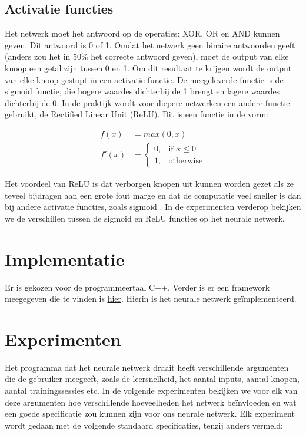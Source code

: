 \documentclass[10pt]{article}
\begin{document}
\subsection{Activatie functies}
Het netwerk moet het antwoord op de operaties: XOR, OR en AND kunnen geven. Dit antwoord is 0 of 1. Omdat het netwerk geen binaire antwoorden geeft (anders zou het in 50\% het correcte antwoord geven), moet de output van elke knoop een getal zijn tussen 0 en 1. Om dit resultaat te krijgen wordt de output van elke knoop gestopt in een activatie functie. De meegeleverde functie is de sigmoid functie, die hogere waardes dichterbij de 1 brengt en lagere waardes dichterbij de 0. In de praktijk wordt voor diepere netwerken een andere functie gebruikt, de Rectified Linear Unit (ReLU). Dit is een functie in de vorm:

\begin{align*}
    f(x) & = max(0,x) \\
    f'(x) & =
            \begin{cases}
                0,& \text{if } x\leq 0\\
                1,& \text{otherwise}
            \end{cases}
\end{align*}

Het voordeel van ReLU is dat verborgen knopen uit kunnen worden gezet als ze teveel bijdragen aan een grote fout marge en dat de computatie veel sneller is dan bij andere activatie functies, zoals sigmoid \cite{relu}. In de experimenten verderop bekijken we de verschillen tussen de sigmoid en ReLU functies op het neurale netwerk.


\section{Implementatie}
Er is gekozen voor de programmeertaal C++. Verder is er een framework meegegeven die te vinden is \href{http://liacs.leidenuniv.nl/~kosterswa/AI/nn.html}{\underline{hier}}\cite{assignment}. Hierin is het neurale netwerk ge\"implementeerd.

\section{Experimenten}
Het programma dat het neurale netwerk draait heeft verschillende argumenten die de gebruiker meegeeft, zoals de leersnelheid, het aantal inputs, aantal knopen, aantal trainingssessies etc. In de volgende experimenten bekijken we voor elk van deze argumenten hoe verschillende hoeveelheden het netwerk be\"invloeden en wat een goede specificatie zou kunnen zijn voor ons neurale netwerk.
Elk experiment wordt gedaan met de volgende standaard specificaties, tenzij anders vermeld:
\end{document}

